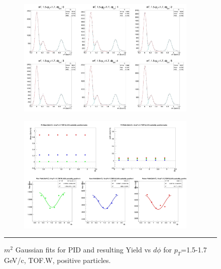 \begin{figure}[H]
  \centering
    \begin{subfigure}[p]{1\textwidth}
   \centering
   \includegraphics[width=0.94\textwidth]{lowptfits/yieldvsdphi_tof1_cent0_ch1_pT-15-17.jpg}
    \end{subfigure}
    \begin{subfigure}[p]{1\textwidth}
   \centering
   \includegraphics[width=0.94\textwidth]{lowptfits/fitParams_tof1_cent0_ch1_pT-15-17.jpg}
    \end{subfigure}
    \rule{35em}{0.5pt}
  \caption[PID fits and Yield vs $d\phi$ for $p_T$=1.5-1.7 GeV/c, TOF.W, positive particles. ]{$m^2$ Gaussian fits for PID and resulting Yield vs $d\phi$ for $p_T$=1.5-1.7 GeV/c, TOF.W, positive particles.}
  \label{fig:fits15-17pos}
\end{figure}


